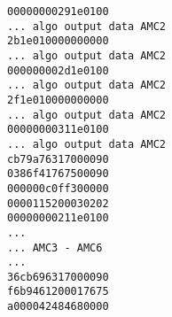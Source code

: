 \texttt{00000000291e0100}\\
\texttt{... algo output data AMC2}\\
\texttt{2b1e010000000000}\\
\texttt{... algo output data AMC2}\\
\texttt{000000002d1e0100}\\
\texttt{... algo output data AMC2}\\
\texttt{2f1e010000000000}\\
\texttt{... algo output data AMC2}\\
\texttt{00000000311e0100}\\
\texttt{... algo output data AMC2}\\
\texttt{cb79a76317000090}\\
\texttt{0386f41767500090}\\
\texttt{000000c0ff300000}\\
\texttt{0000115200030202}\\
\texttt{00000000211e0100}\\
\texttt{...}\\
\texttt{... AMC3 - AMC6}\\
\texttt{...}\\
\texttt{36cb696317000090}\\
\texttt{f6b9461200017675}\\
\texttt{a000042484680000}\\
